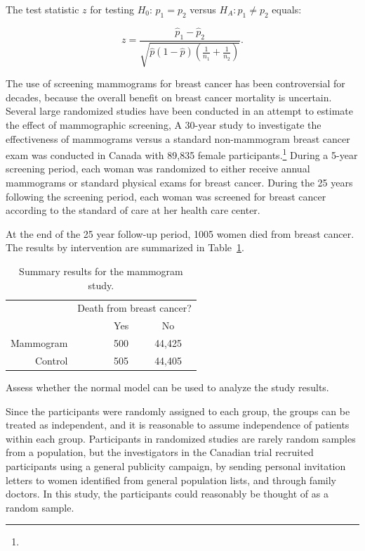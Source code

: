 The test statistic $z$ for testing $H_0:\, p_1 = p_2$ versus $H_A: p_1 \neq p_2$ equals:

\[z = \dfrac{\hat{p}_1 - \hat{p}_2}{\sqrt{\hat{p}(1-\hat{p})\left(\frac{1}{n_1} + \frac{1}{n_2} \right)}}. \]
 

\begin{example}{The use of screening mammograms for breast cancer has been controversial for decades, because the overall benefit on breast cancer mortality is uncertain.  Several large randomized studies have been conducted in an attempt to estimate the effect of mammographic screening,  A 30-year study to investigate the effectiveness of mammograms versus a standard non-mammogram breast cancer exam was conducted in Canada with 89,835 female participants.\footnote{} During a 5-year screening period, each woman was randomized to either receive annual mammograms or standard physical exams for breast cancer.  During the 25 years following the screening period, each woman was screened for breast cancer according to the standard of care at her health care center. 

At the end of the 25 year follow-up period, 1005 women died from breast cancer. The results by intervention are summarized in Table~\ref{mammogramStudySummaryTable}.
		
\begin{table}[h]
	\centering
	\begin{tabular}{rrcc}
		& \multicolumn{3}{c}{Death from breast cancer?} \\
		\cline{2-4}
		& \ \hspace{3mm}\ & Yes & No \\
		\hline
		Mammogram && 500 & 44,425 \\
		Control && 505 & 44,405 \\
		\hline
	\end{tabular}
	\caption{Summary results for the mammogram study.}
	\label{mammogramStudySummaryTable}
\end{table}

Assess whether the normal model can be used to analyze the study results.}

Since the participants were randomly assigned to each group, the groups can be treated as independent, and it is reasonable to assume independence of patients within each group.  Participants in randomized studies are rarely random samples from a population, but the investigators in the Canadian trial recruited  participants using a general publicity campaign, by sending personal invitation letters to women identified from general population lists, and through family doctors.  In this study, the participants could reasonably be thought of as a random sample.



\end{example}

